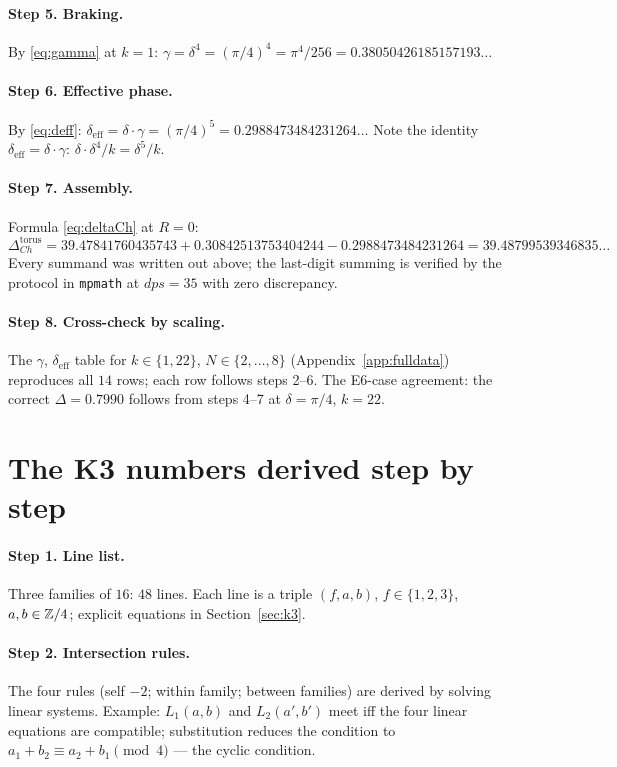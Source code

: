 \paragraph{Step 5. Braking.} By \eqref{eq:gamma} at $k=1$:
$\gamma=\delta^4=(\pi/4)^4=\pi^4/256=0.38050426185157193\ldots$

\paragraph{Step 6. Effective phase.} By \eqref{eq:deff}:
$\delta_{\mathrm{eff}}=\delta\cdot\gamma=(\pi/4)^5
=0.2988473484231264\ldots$ Note the identity
$\delta_{\mathrm{eff}}=\delta\cdot\gamma$:
$\delta\cdot\delta^4/k=\delta^5/k$.

\paragraph{Step 7. Assembly.} Formula \eqref{eq:deltaCh} at $R=0$:
\[
  \Delta_{Ch}^{\mathrm{torus}}
  =39.47841760435743+0.30842513753404244-0.2988473484231264
  =39.48799539346835\ldots
\]
Every summand was written out above; the last-digit summing is
verified by the protocol in \texttt{mpmath} at $dps=35$ with zero
discrepancy.

\paragraph{Step 8. Cross-check by scaling.} The $\gamma$,
$\delta_{\mathrm{eff}}$ table for $k\in\{1,22\}$, $N\in\{2,\dots,8\}$
(Appendix~\ref{app:fulldata}) reproduces all $14$ rows; each row
follows steps 2--6. The E6-case agreement: the correct
$\Delta=0.7990$ follows from steps 4--7 at $\delta=\pi/4$, $k=22$.

\section{The K3 numbers derived step by step}\label{sec:workk3}

\paragraph{Step 1. Line list.} Three families of $16$: $48$ lines.
Each line is a triple $(f,a,b)$, $f\in\{1,2,3\}$, $a,b\in\mathbb{Z}/4$;
explicit equations in Section~\ref{sec:k3}.

\paragraph{Step 2. Intersection rules.} The four rules (self $-2$;
within family; between families) are derived by solving linear
systems. Example: $L_1(a,b)$ and $L_2(a',b')$ meet iff the four
linear equations are compatible; substitution reduces the condition
to $a_1+b_2\equiv a_2+b_1\pmod4$ --- the cyclic condition.

